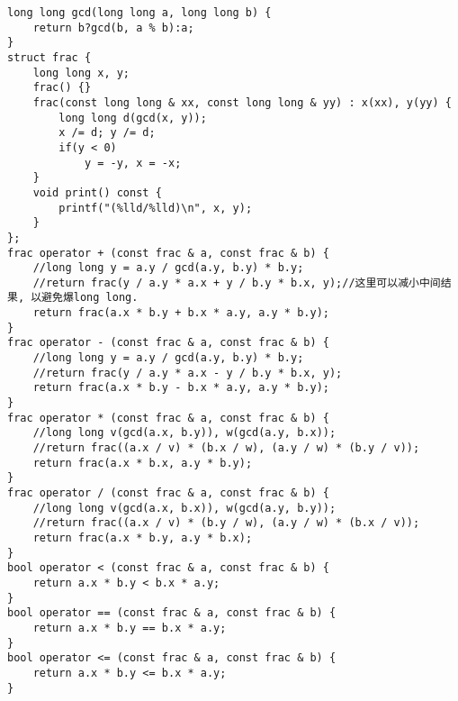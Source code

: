 \begin{lstlisting}
long long gcd(long long a, long long b) {
	return b?gcd(b, a % b):a;
}
struct frac {
	long long x, y;
	frac() {}
	frac(const long long & xx, const long long & yy) : x(xx), y(yy) {
		long long d(gcd(x, y));
		x /= d; y /= d;
		if(y < 0) 
			y = -y, x = -x;
	}
	void print() const {
		printf("(%lld/%lld)\n", x, y);
	}
};
frac operator + (const frac & a, const frac & b) {
	//long long y = a.y / gcd(a.y, b.y) * b.y;
	//return frac(y / a.y * a.x + y / b.y * b.x, y);//这里可以减小中间结果, 以避免爆long long.
	return frac(a.x * b.y + b.x * a.y, a.y * b.y);
}
frac operator - (const frac & a, const frac & b) {
	//long long y = a.y / gcd(a.y, b.y) * b.y;
	//return frac(y / a.y * a.x - y / b.y * b.x, y);
	return frac(a.x * b.y - b.x * a.y, a.y * b.y);
}
frac operator * (const frac & a, const frac & b) {
	//long long v(gcd(a.x, b.y)), w(gcd(a.y, b.x));
	//return frac((a.x / v) * (b.x / w), (a.y / w) * (b.y / v));
	return frac(a.x * b.x, a.y * b.y);
}
frac operator / (const frac & a, const frac & b) {
	//long long v(gcd(a.x, b.x)), w(gcd(a.y, b.y));
	//return frac((a.x / v) * (b.y / w), (a.y / w) * (b.x / v));
	return frac(a.x * b.y, a.y * b.x);
}
bool operator < (const frac & a, const frac & b) {
	return a.x * b.y < b.x * a.y;
}
bool operator == (const frac & a, const frac & b) {
	return a.x * b.y == b.x * a.y;
}
bool operator <= (const frac & a, const frac & b) {
	return a.x * b.y <= b.x * a.y;
}
 

\end{lstlisting}
